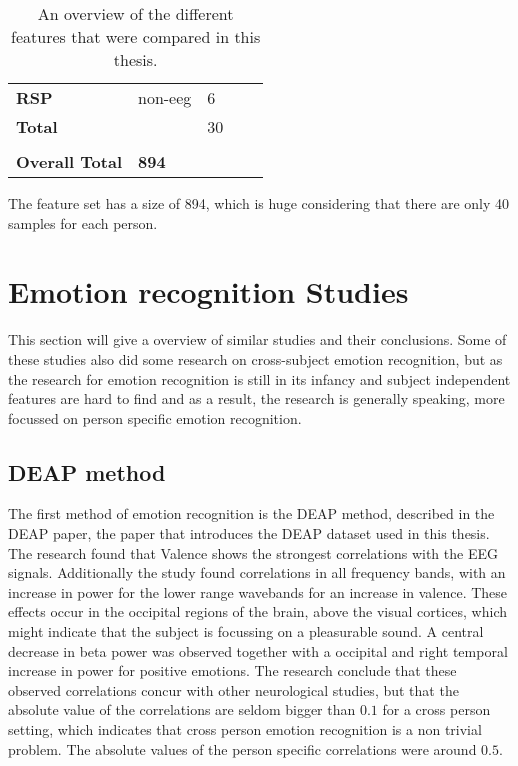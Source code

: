 \begin{table}[]
\begin{tabular}{lllll}
\textbf{RSP}            & non-eeg       & 6                             &                           &              \\
\textbf{Total}          &               & 30                            &                           &              \\
                        &               &                               &                           &              \\
\textbf{Overall Total}  & \textbf{894}  &                               &                           &             
\end{tabular}
\caption{An overview of the different features that were compared in this thesis.\label{featOverviewTable}}
\end{table}

The feature set has a size of 894, which is huge considering that there are only 40 samples for each person. %

\section{Emotion recognition Studies}
This section will give a overview of similar studies and their conclusions. Some of these studies also did some research on cross-subject emotion recognition, but as the research for emotion recognition is still in its infancy\citep{emorecoghard} and subject independent features are hard to find \citep{DEAP} and as a result, the research is generally speaking, more focussed on person specific emotion recognition.

\subsection{DEAP method}
The first method of emotion recognition is the DEAP method, described in the DEAP paper\citep{DEAP}, the paper that introduces the DEAP dataset used in this thesis. The research found that Valence shows the strongest correlations with the EEG signals. Additionally the study found correlations in all frequency bands, with an increase in power for the lower range wavebands for an increase in valence. These effects occur in the occipital regions of the brain, above the visual cortices, which might indicate that the subject is focussing on a pleasurable sound. A central decrease in beta power was observed together with a occipital and right temporal increase in power for positive emotions. The research conclude that these observed correlations concur with other neurological studies, but that the absolute value of the correlations are seldom bigger than $0.1$ for a cross person setting, which indicates that cross person emotion recognition is a non trivial problem. The absolute values of the person specific correlations were around $0.5$.

